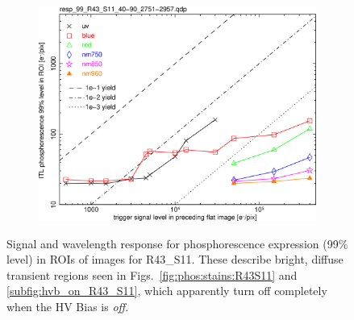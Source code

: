 \begin{figure}[!htbp]
\centering
\begin{subfigure}{0.45\textwidth}    
  \centering
  \includegraphics[width=\textwidth]{figures/phosphorescence-survey/phos_resp/resp_99_R43_S11_40-90_2751-2957.png}    
\end{subfigure}
\newline
\caption{Signal and wavelength response for phosphorescence expression (99\% level) in ROIs of images for R43\_S11. These describe bright, diffuse transient regions seen in Figs.~\ref{fig:phos:stains:R43S11} and \ref{subfig:hvb_on_R43_S11}, which apparently turn off completely when the HV Bias is {\it off}.}
\label{fig:phos:resp:R43S11}
\end{figure}

